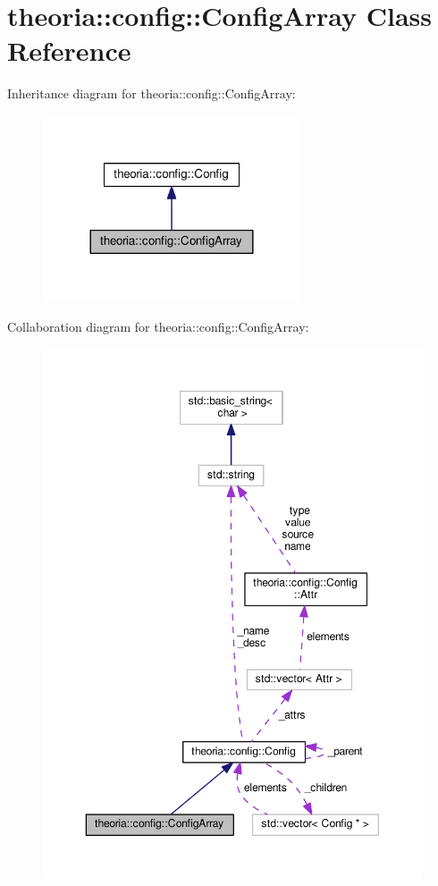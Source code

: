 \hypertarget{classtheoria_1_1config_1_1ConfigArray}{\section{theoria\+:\+:config\+:\+:Config\+Array Class Reference}
\label{classtheoria_1_1config_1_1ConfigArray}
}


Inheritance diagram for theoria\+:\+:config\+:\+:Config\+Array\+:
\nopagebreak
\begin{figure}[H]
\begin{center}
\leavevmode
\includegraphics[width=216pt]{classtheoria_1_1config_1_1ConfigArray__inherit__graph}
\end{center}
\end{figure}


Collaboration diagram for theoria\+:\+:config\+:\+:Config\+Array\+:
\nopagebreak
\begin{figure}[H]
\begin{center}
\leavevmode
\includegraphics[width=350pt]{classtheoria_1_1config_1_1ConfigArray__coll__graph}
\end{center}
\end{figure}
